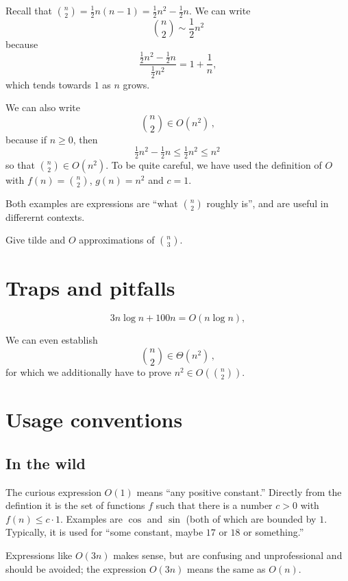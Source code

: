 \documentclass{tstextbook}
\begin{document}
\begin{example}
  Recall that $\binom{n}{2} = \frac12 n(n-1) = \frac 12 n^2 - \frac12 n$.
We can write
  \[ \binom{n}{2} \sim \frac12 n^2  \]
  because \[
    \frac{\frac12 n^2 - \frac 12 n}{\frac12 n^2}   = 
    1+ \frac{1}{n},\]
  which tends towards $1$ as $n$ grows.

 We can also write
  \[ \binom{n}{2} \in O(n^2)\,,\]
  because if $n\geq 0$, then 
  \[\tfrac12 n^2 - \tfrac12 n \leq  \tfrac12 n^2 \leq n^2\,\]
  so that $\binom{n}{2} \in O(n^2)$.
  To be quite careful, we have used the definition of $O$ with $f(n)=\binom{n}{2}$, $g(n)=n^2$ and $c=1$.

  \medskip
  Both examples are expressions are ``what $\binom{n}{2}$ roughly is'', and are useful in differernt contexts.
\end{example}

\begin{exercise}
  Give tilde and $O$ approximations of $\binom{n}{3}$.
\end{exercise}

\section{Traps and pitfalls}

 \[3n\log n + 100 n = O(n\log n), \] 


  We can  even establish
  \[ \binom{n}{2} \in \Theta(n^2)\,,\]
  for which we additionally have to prove $n^2\in O(\binom{n}{2})$.


\section{Usage conventions}

\subsection{In the wild}

The curious expression \(O(1)\) means “any positive constant.” 
Directly from the defintion it is the set of functions $f$ such that there is a number $c>0$ with $f(n)\leq c\cdot 1$.
Examples are $\cos$ and $\sin$ (both of which are bounded by $1$.
Typically, it is used for ``some constant, maybe $17$ or $18$ or something.''

Expressions like $O(3n)$ makes sense, but are confusing and unprofessional and should be avoided; the expression $O(3n)$ means the same as $O(n)$.
\end{document}
